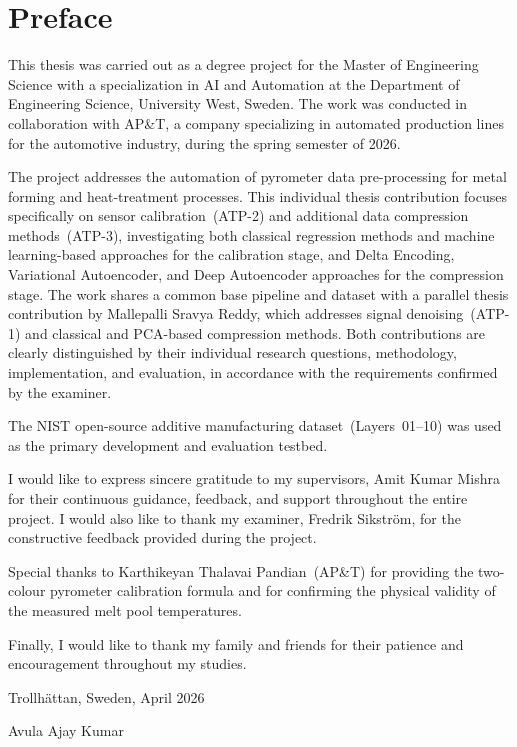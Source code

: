 \section*{Preface}
\vspace{-2ex}\titlerule\vspace{4ex}

This thesis was carried out as a degree project for the Master of Engineering Science with a specialization in AI and Automation at the Department of Engineering Science, University West, Sweden. The work was conducted in collaboration with AP\&T, a company specializing in automated production lines for the automotive industry, during the spring semester of 2026.

The project addresses the automation of pyrometer data pre-processing for metal forming and heat-treatment processes. This individual thesis contribution focuses specifically on sensor calibration~(ATP-2) and additional data compression methods~(ATP-3), investigating both classical regression methods and machine learning-based approaches for the calibration stage, and Delta Encoding, Variational Autoencoder, and Deep Autoencoder approaches for the compression stage. The work shares a common base pipeline and dataset with a parallel thesis contribution by Mallepalli Sravya Reddy, which addresses signal denoising~(ATP-1) and classical and PCA-based compression methods. Both contributions are clearly distinguished by their individual research questions, methodology, implementation, and evaluation, in accordance with the requirements confirmed by the examiner.

The NIST open-source additive manufacturing dataset~(Layers~01--10) was used as the primary development and evaluation testbed.

I would like to express sincere gratitude to my supervisors, Amit Kumar Mishra for their continuous guidance, feedback, and support throughout the entire project. I would also like to thank my examiner, Fredrik Sikstr\"{o}m, for the constructive feedback provided during the project.

Special thanks to Karthikeyan Thalavai Pandian~(AP\&T) for providing the two-colour pyrometer calibration formula and for confirming the physical validity of the measured melt pool temperatures.

Finally, I would like to thank my family and friends for their patience and encouragement throughout my studies.

\vspace{1cm}
Trollh\"{a}ttan, Sweden, April 2026

\vspace{1cm}
Avula Ajay Kumar
